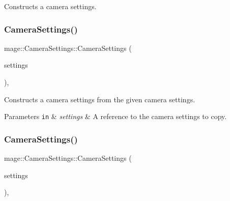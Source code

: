 Constructs a camera settings. \hypertarget{classmage_1_1_camera_settings_a651ea29eb3050113c0d1b9d0594ed123}{}\label{classmage_1_1_camera_settings_a651ea29eb3050113c0d1b9d0594ed123} 
\subsubsection{\texorpdfstring{Camera\+Settings()}{CameraSettings()}\hspace{0.1cm}{\footnotesize\ttfamily [2/3]}}
{\footnotesize\ttfamily mage\+::\+Camera\+Settings\+::\+Camera\+Settings (\begin{DoxyParamCaption}\item[{const \hyperlink{classmage_1_1_camera_settings}{Camera\+Settings} \&}]{settings }\end{DoxyParamCaption})\hspace{0.3cm}{\ttfamily [default]}, {\ttfamily [noexcept]}}

Constructs a camera settings from the given camera settings.


\begin{DoxyParams}[1]{Parameters}
\mbox{\tt in}  & {\em settings} & A reference to the camera settings to copy. \\
\hline
\end{DoxyParams}
\hypertarget{classmage_1_1_camera_settings_af69f6271c0a84441ed2012ab9feaae47}{}\label{classmage_1_1_camera_settings_af69f6271c0a84441ed2012ab9feaae47} 
\subsubsection{\texorpdfstring{Camera\+Settings()}{CameraSettings()}\hspace{0.1cm}{\footnotesize\ttfamily [3/3]}}
{\footnotesize\ttfamily mage\+::\+Camera\+Settings\+::\+Camera\+Settings (\begin{DoxyParamCaption}\item[{\hyperlink{classmage_1_1_camera_settings}{Camera\+Settings} \&\&}]{settings }\end{DoxyParamCaption})\hspace{0.3cm}{\ttfamily [default]}, {\ttfamily [noexcept]}}

